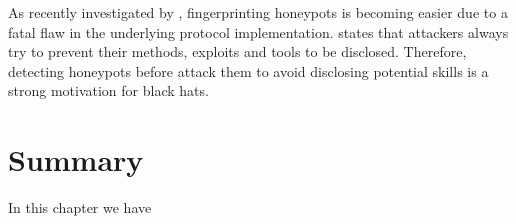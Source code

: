 As recently investigated by \citet{vetterl2020}, fingerprinting honeypots is becoming easier due to a fatal flaw in the underlying protocol implementation.
\citet{vetterl2020} states that attackers always try to prevent their methods, exploits and tools to be disclosed.
Therefore, detecting honeypots before attack them to avoid disclosing potential skills is a strong motivation for black hats.


\section{Summary}

In this chapter we have
